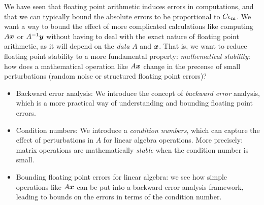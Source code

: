 
We have seen that floating point arithmetic induces errors in computations, and that we can typically bound the absolute errors to be proportional to $C \ensuremath{\epsilon}_{\rm m}$. We want a way to bound the effect of more complicated calculations like computing $A \bm{{\mbox{\boldmath$x$\unboldmath}}}$ or $A^{-1} \bm{{\mbox{\boldmath$y$\unboldmath}}}$ without having to deal with the exact nature of floating point arithmetic, as it will depend on the \emph{data} $A$ and $\bm{{\mbox{\boldmath$x$\unboldmath}}}$.  That is, we want to reduce floating point stability to a more fundamental property: \emph{mathematical stability}: how does a mathematical operation like $A \bm{{\mbox{\boldmath$x$\unboldmath}}}$ change in the precense of  small perturbations (random noise or structured floating point errors)?

\begin{itemize}
\item[1. ] Backward error analysis: We introduce the concept of \emph{backward error} analysis, which is a more practical way of understanding and bounding floating point errors.


\item[2. ] Condition numbers: We introduce a \emph{condition numbers}, which can capture the effect of perturbations in $A$ for linear algebra operations. More precisely: matrix operations are mathematically \emph{stable}  when the condition number is small.


\item[3. ] Bounding floating point errors for linear algebra: we see how simple operations like $A \bm{{\mbox{\boldmath$x$\unboldmath}}}$ can be put into a backward error analysis framework, leading to bounds on the errors in terms of the condition number. 

\end{itemize}
